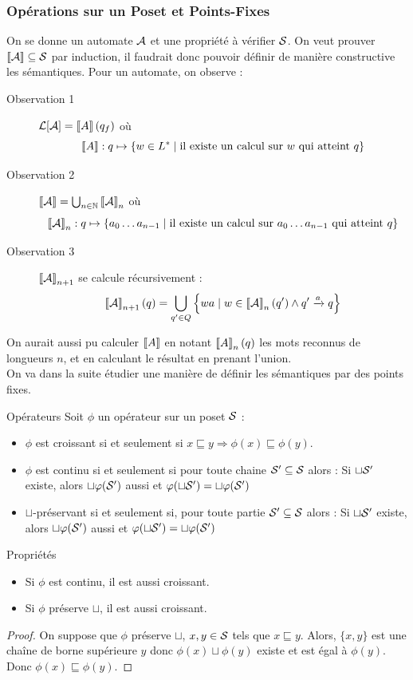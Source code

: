 \documentclass{cours}
\begin{document}
\subsubsection{Opérations sur un Poset et Points-Fixes}
On se donne un automate $\mathcal{A}$ et une propriété à vérifier $\mathcal{S}$. On veut prouver $\left\llbracket \mathcal{A} \right\rrbracket \subseteq \mathcal{S}$ par induction, il faudrait donc pouvoir définir de manière constructive les sémantiques. Pour un automate, on observe :
\begin{description}
	\item[Observation 1] $\mathcal{L}[\mathcal{A}] = \left\llbracket A \right\rrbracket(q_{f})$ où \[\left\llbracket A \right\rrbracket: q \mapsto \left\{w \in L^{*}\mid \text{il existe un calcul sur } w \text{ qui atteint } q\right\}\]
	\item[Observation 2] $\left\llbracket \mathcal{A} \right\rrbracket = \bigcup_{n \in \mathbb{N}} \left\llbracket \mathcal{A} \right\rrbracket_{n}$ où \[\left\llbracket \mathcal{A} \right\rrbracket_{n} : q \mapsto \{a_{0}\ldots a_{n - 1}\mid \text{il existe un calcul sur } a_{0} \ldots a_{n - 1}\text{ qui atteint } q\}\]
	\item[Observation 3] $\left\llbracket \mathcal{A} \right\rrbracket_{n + 1}$ se calcule récursivement :
	      \[
		      \left\llbracket \mathcal{A} \right\rrbracket_{n + 1}(q) = \bigcup_{q'\in Q} \left\{wa \mid w \in \left\llbracket \mathcal{A} \right\rrbracket_{n}(q') \land q'\xrightarrow{a}q\right\}
	      \]
\end{description}
On aurait aussi pu calculer $\left\llbracket A \right\rrbracket$ en notant $\left\llbracket A \right\rrbracket_{n}(q)$ les mots reconnus de longueurs $n$, et en calculant le résultat en prenant l'union. \\
On va dans la suite étudier une manière de définir les sémantiques par des points fixes.

\begin{définition}{Opérateurs}{}
Soit $\phi$ un opérateur sur un poset $\mathcal{S}$ :
\begin{itemize}
	\item $\phi$ est croissant si et seulement si $x \sqsubseteq y \Longrightarrow \phi(x) \sqsubseteq \phi(y)$.
	\item $\phi$ est continu si et seulement si pour toute chaine $\mathcal{S}' \subseteq \mathcal{S}$ alors : Si $\sqcup \mathcal{S}'$ existe, alors $\sqcup \varphi(\mathcal{S}')$ aussi et $\varphi(\sqcup \mathcal{S}') = \sqcup \varphi(\mathcal{S}')$
	\item $\sqcup$-préservant si et seulement si, pour toute partie $\mathcal{S}' \subseteq \mathcal{S}$ alors : Si $\sqcup \mathcal{S}'$ existe, alors $\sqcup \varphi(\mathcal{S}')$ aussi et $\varphi(\sqcup \mathcal{S}') = \sqcup \varphi(\mathcal{S}')$
\end{itemize}
\end{définition}
\begin{propositionfr}{Propriétés}{}
	\begin{itemize}
		\item Si $\phi$ est continu, il est aussi croissant.
		\item Si $\phi$ préserve $\sqcup$, il est aussi croissant.
	\end{itemize}
\end{propositionfr}
\begin{proof}
	On suppose que $\phi$ préserve $\sqcup$, $x, y \in \mathcal{S}$ tels que $x \sqsubseteq y$. Alors, $\{x, y\}$ est une chaîne de borne supérieure $y$ donc $\phi(x) \sqcup \phi(y)$ existe et est égal à $\phi(y)$. Donc $\phi(x) \sqsubseteq \phi(y)$.
\end{proof}
\end{document}
